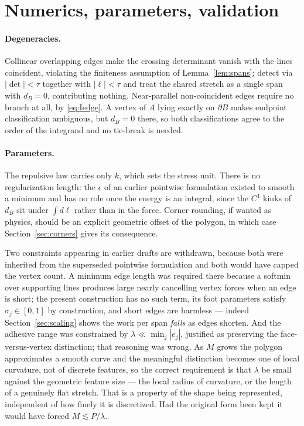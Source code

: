 \documentclass[11pt]{article}
\begin{document}
\section{Numerics, parameters, validation}
\label{sec:numerics}

\paragraph{Degeneracies.} Collinear overlapping edges make the crossing determinant vanish with the lines coincident, violating the finiteness assumption of Lemma~\ref{lem:spans}; detect via $|\det|<\tau$ together with $|\ell|<\tau$ and treat the shared stretch as a single span with $d_B = 0$, contributing nothing. Near-parallel non-coincident edges require no branch at all, by \eqref{eq:Iedge}. A vertex of $A$ lying exactly on $\partial B$ makes endpoint classification ambiguous, but $d_B = 0$ there, so both classifications agree to the order of the integrand and no tie-break is needed.

\paragraph{Parameters.} The repulsive law carries only $k$, which sets the stress unit. There is no regularization length: the $\epsilon$ of an earlier pointwise formulation existed to smooth a minimum and has no role once the energy is an integral, since the $C^1$ kinks of $d_B$ sit under $\int d\ell$ rather than in the force. Corner rounding, if wanted as physics, should be an explicit geometric offset of the polygon, in which case Section~\ref{sec:corners} gives its consequence.

Two constraints appearing in earlier drafts are withdrawn, because both were inherited from the superseded pointwise formulation and both would have capped the vertex count. A minimum edge length was required there because a softmin over supporting lines produces large nearly cancelling vertex forces when an edge is short; the present construction has no such term, its foot parameters satisfy $\sigma_j\in[0,1]$ by construction, and short edges are harmless --- indeed Section~\ref{sec:scaling} shows the work per span \emph{falls} as edges shorten. And the adhesive range was constrained by $\lambda\ll\min_j|e_j|$, justified as preserving the face-versus-vertex distinction; that reasoning was wrong. As $M$ grows the polygon approximates a smooth curve and the meaningful distinction becomes one of local curvature, not of discrete features, so the correct requirement is that $\lambda$ be small against the geometric feature size --- the local radius of curvature, or the length of a genuinely flat stretch. That is a property of the shape being represented, independent of how finely it is discretized. Had the original form been kept it would have forced $M\lesssim P/\lambda$.
\end{document}
